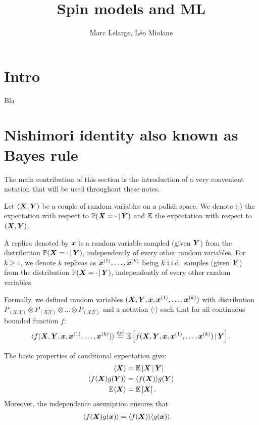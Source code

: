 \documentclass[12pt,nocut]{article}
\title{Spin models and ML}
\author{Marc Lelarge, Léo Miolane}
\date{}
\begin{document}
\maketitle{}

\section{Intro}
Bla

\section{Nishimori identity also known as Bayes rule}

The main contribution of this section is the introduction of a very convenient notation that will be used throughout these notes. 

\begin{definition}\label{def:setup-nishimori}
Let $({\boldsymbol X},{\boldsymbol Y})$ be a couple of random variables on a polish space. We denote $\langle \cdot \rangle$ the expectation with respect to $\mathbb{P}({\boldsymbol X}=\cdot \, | \, {\boldsymbol Y})$ and $\mathbb{E}$ the expectation with respect to $({\boldsymbol X},{\boldsymbol Y})$.

A replica denoted by ${\boldsymbol x}$ is a random variable sampled (given ${\boldsymbol Y}$) from the distribution $\mathbb{P}({\boldsymbol X}=\cdot \, | \, {\boldsymbol Y})$, independently of every other random variables. For $k \geq 1$, we denote $k$ replicas as ${\boldsymbol x}^{(1)}, \dots, {\boldsymbol x}^{(k)}$ being $k$ i.i.d.\ samples (given ${\boldsymbol Y}$) from the distribution $\mathbb{P}({\boldsymbol X}=\cdot \, | \, {\boldsymbol Y})$, independently of every other random variables.
\end{definition}

Formally, we defined random variables $({\boldsymbol X},{\boldsymbol Y},{\boldsymbol x},{\boldsymbol x}^{(1)}, \dots, {\boldsymbol x}^{(k)})$ with distribution $P_{(X,Y)}\!\otimes \! P_{(X|Y)}\!\otimes \!\dots \!\otimes \! P_{(X|Y)}$ and a notation $\langle \cdot \rangle$ such that for all continuous bounded function $f$:
$$
\langle f({\boldsymbol X},{\boldsymbol Y},{\boldsymbol x},{\boldsymbol x}^{(1)}, \dots, {\boldsymbol x}^{(k)}) \rangle \overset{{\rm def}}{=} \mathbb{E} \left[ f({\boldsymbol X},{\boldsymbol Y},{\boldsymbol x},{\boldsymbol x}^{(1)}, \dots, {\boldsymbol x}^{(k)}) \, | \, {\boldsymbol Y} \right].
$$

The basic properties of conditional expectation give:
\begin{align*}
\langle {\boldsymbol X} \rangle &= \mathbb{E}\left[ {\boldsymbol X} \, | \, {\boldsymbol Y} \right]\\
\langle f({\boldsymbol X})g({\boldsymbol Y}) \rangle &= \langle f({\boldsymbol X})\rangle g({\boldsymbol Y})\\
\mathbb{E} \langle {\boldsymbol X} \rangle &= \mathbb{E} \left[ {\boldsymbol X} \right].
\end{align*}
Moreover, the independence assumption ensures that
\begin{align*}
\langle f({\boldsymbol X})g({\boldsymbol x}) \rangle &= \langle f({\boldsymbol X})\rangle \langle g({\boldsymbol x})\rangle.
\end{align*}
\end{document}
